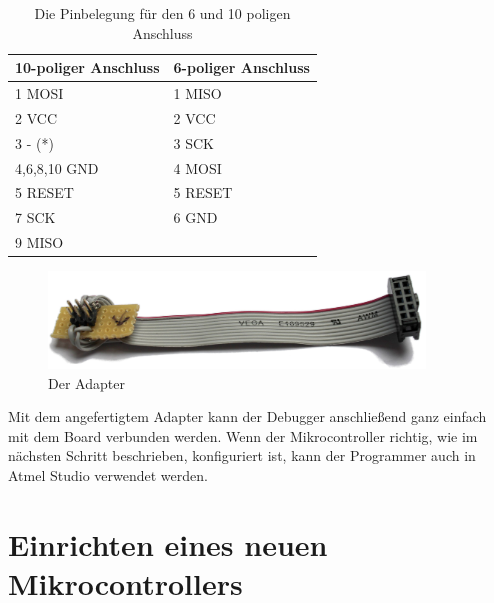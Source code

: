 \begin{table}[H]
\centering
\begin{tabular}{|l|l|} \hline
	 \textbf{10-poliger Anschluss} & \textbf{6-poliger Anschluss} \\ \hline
	 1 MOSI & 1 MISO \\ \hline
	 2 VCC & 2 VCC \\ \hline
	 3 - (*) & 3 SCK \\ \hline
	 4,6,8,10 GND & 4 MOSI \\ \hline
	 5 RESET & 5 RESET \\ \hline
	 7 SCK & 6 GND \\ \hline
	 9 MISO &   \\ \hline
\end{tabular}
\caption{Die Pinbelegung für den 6 und 10 poligen Anschluss \cite{mikrocontroller.isp}}
\label{pinbelegung}
\end{table}

\begin{figure}[htp]
\begin{center}
  \includegraphics[width=10cm]{content/pictures/Anleitung/adapter.jpg}
  \caption{Der Adapter}
  \label{adapter}
\end{center}
\end{figure}

Mit dem angefertigtem Adapter kann der Debugger anschließend ganz einfach mit
dem Board verbunden werden. Wenn der Mikrocontroller richtig, wie im nächsten Schritt
beschrieben, konfiguriert ist, kann der Programmer auch in Atmel Studio
verwendet werden.

\section{Einrichten eines neuen Mikrocontrollers}
\label{Chapt:Einrichten}

